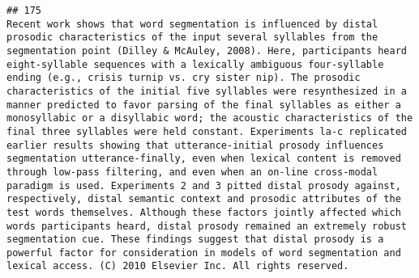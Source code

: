\documentclass[
  english,
  man]{apa6}
\begin{document}
\begin{verbatim}
## 175                                                                                                                                                                                                                                                                                                                                                                                                                                                                                                                                                                                                                                                                                                                                                                                                                                                                                                                                                                                                                                                                                                                                                                                                                                                                                                                                          Recent work shows that word segmentation is influenced by distal prosodic characteristics of the input several syllables from the segmentation point (Dilley & McAuley, 2008). Here, participants heard eight-syllable sequences with a lexically ambiguous four-syllable ending (e.g., crisis turnip vs. cry sister nip). The prosodic characteristics of the initial five syllables were resynthesized in a manner predicted to favor parsing of the final syllables as either a monosyllabic or a disyllabic word; the acoustic characteristics of the final three syllables were held constant. Experiments la-c replicated earlier results showing that utterance-initial prosody influences segmentation utterance-finally, even when lexical content is removed through low-pass filtering, and even when an on-line cross-modal paradigm is used. Experiments 2 and 3 pitted distal prosody against, respectively, distal semantic context and prosodic attributes of the test words themselves. Although these factors jointly affected which words participants heard, distal prosody remained an extremely robust segmentation cue. These findings suggest that distal prosody is a powerful factor for consideration in models of word segmentation and lexical access. (C) 2010 Elsevier Inc. All rights reserved.

\end{verbatim}
\end{document}
